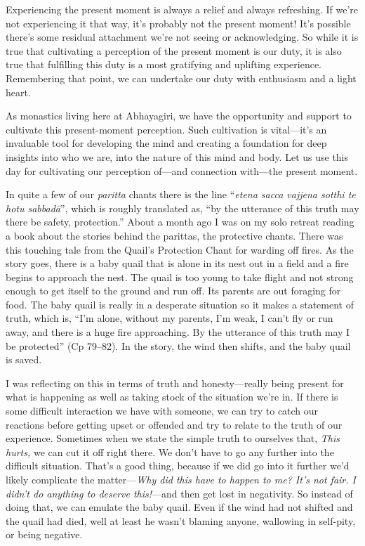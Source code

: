 Experiencing the present moment is always a relief and always 
refreshing. If we're not experiencing it that way, it's probably not 
the present moment! It's possible there's some residual attachment 
we're not seeing or acknowledging. So while it is true that cultivating 
a perception of the present moment is our duty, it is also true that 
fulfilling this duty is a most gratifying and uplifting experience. 
Remembering that point, we can undertake our duty with enthusiasm and a 
light heart.

As monastics living here at Abhayagiri, we have the opportunity and 
support to cultivate this present-moment perception. Such cultivation 
is vital---it's an invaluable tool for developing the mind and creating 
a foundation for deep insights into who we are, into the nature of this 
mind and body. Let us use this day for cultivating our perception 
of---and connection with---the present moment.


In quite a few of our \emph{paritta} chants there is the line 
``\emph{etena sacca vajjena sotthi te hotu sabbadā}'', which is 
roughly translated as, ``by the utterance of this truth may there be 
safety, protection.'' About a month ago I was on my solo retreat 
reading a book about the stories behind the parittas, the protective 
chants. There was this touching tale from the Quail's Protection Chant 
for warding off fires. As the story goes, there is a baby quail that is 
alone in its nest out in a field and a fire begins to approach the 
nest. The quail is too young to take flight and not strong enough to 
get itself to the ground and run off. Its parents are out foraging for 
food. The baby quail is really in a desperate situation so it makes a 
statement of truth, which is, ``I'm alone, without my parents, I'm 
weak, I can't fly or run away, and there is a huge fire approaching. By 
the utterance of this truth may I be protected'' (Cp 79–82). In the 
story, the wind then shifts, and the baby quail is saved.

I was reflecting on this in terms of truth and honesty---really being 
present for what is happening as well as taking stock of the situation 
we're in. If there is some difficult interaction we have with someone, 
we can try to catch our reactions before getting upset or offended and 
try to relate to the truth of our experience. Sometimes when we state 
the simple truth to ourselves that, \emph{This hurts,} we can cut it 
off right there. We don't have to go any further into the difficult 
situation. That's a good thing, because if we did go into it further 
we'd likely complicate the matter---\emph{Why did this have to happen 
to me? It's not fair. I didn't do anything to deserve this!}---and then 
get lost in negativity. So instead of doing that, we can emulate the 
baby quail. Even if the wind had not shifted and the quail had died, 
well at least he wasn't blaming anyone, wallowing in self-pity, or 
being negative.

